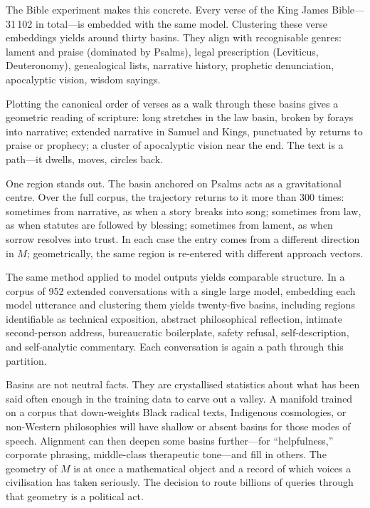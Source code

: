 \documentclass[12pt,a4paper]{article}
\begin{document}
The Bible experiment makes this concrete. Every verse of the King James Bible---31\,102 in total---is embedded with the same model. Clustering these verse embeddings yields around thirty basins. They align with recognisable genres: lament and praise (dominated by Psalms), legal prescription (Leviticus, Deuteronomy), genealogical lists, narrative history, prophetic denunciation, apocalyptic vision, wisdom sayings.

Plotting the canonical order of verses as a walk through these basins gives a geometric reading of scripture: long stretches in the law basin, broken by forays into narrative; extended narrative in Samuel and Kings, punctuated by returns to praise or prophecy; a cluster of apocalyptic vision near the end. The text is a path---it dwells, moves, circles back.

One region stands out. The basin anchored on Psalms acts as a gravitational centre. Over the full corpus, the trajectory returns to it more than 300 times: sometimes from narrative, as when a story breaks into song; sometimes from law, as when statutes are followed by blessing; sometimes from lament, as when sorrow resolves into trust. In each case the entry comes from a different direction in $M$; geometrically, the same region is re-entered with different approach vectors.

The same method applied to model outputs yields comparable structure. In a corpus of 952 extended conversations with a single large model, embedding each model utterance and clustering them yields twenty-five basins, including regions identifiable as technical exposition, abstract philosophical reflection, intimate second-person address, bureaucratic boilerplate, safety refusal, self-description, and self-analytic commentary. Each conversation is again a path through this partition.

Basins are not neutral facts. They are crystallised statistics about what has been said often enough in the training data to carve out a valley. A manifold trained on a corpus that down-weights Black radical texts, Indigenous cosmologies, or non-Western philosophies will have shallow or absent basins for those modes of speech. Alignment can then deepen some basins further---for ``helpfulness,'' corporate phrasing, middle-class therapeutic tone---and fill in others. The geometry of $M$ is at once a mathematical object and a record of which voices a civilisation has taken seriously. The decision to route billions of queries through that geometry is a political act.
\end{document}
